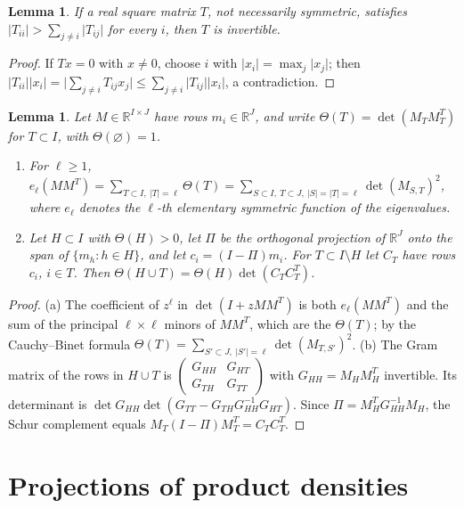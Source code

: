 \documentclass[11pt]{amsart}
\numberwithin{equation}{section}
\newtheorem{lemma}[theorem]{Lemma}
\theoremstyle{definition}
\theoremstyle{remark}
\newcommand{\R}{\mathbb R}
\newcommand{\1}{\mathbf 1}
\newcommand{\abs}[1]{\lvert #1\rvert}
\begin{document}
\begin{lemma}\label{lem:dd}
If a real square matrix $T$, not necessarily symmetric, satisfies $\abs{T_{ii}}>\sum_{j\ne i}\abs{T_{ij}}$ for every $i$, then $T$ is invertible.
\end{lemma}

\begin{proof}
If $Tx=0$ with $x\ne0$, choose $i$ with $\abs{x_i}=\max_j\abs{x_j}$; then $\abs{T_{ii}}\abs{x_i}=\abs{\sum_{j\ne i}T_{ij}x_j}\le\sum_{j\ne i}\abs{T_{ij}}\abs{x_i}$, a contradiction.
\end{proof}

\begin{lemma}\label{lem:gram}
Let $M\in\R^{I\times J}$ have rows $m_i\in\R^J$, and write $\Theta(T)=\det(M_TM_T^T)$ for $T\subset I$, with $\Theta(\varnothing)=1$.
\begin{enumerate}
\item[(a)] For $\ell\ge1$, $e_\ell(MM^T)=\sum_{T\subset I,\ \abs T=\ell}\Theta(T)=\sum_{S\subset I,\ T\subset J,\ \abs S=\abs T=\ell}\det(M_{S,T})^2$, where $e_\ell$ denotes the $\ell$-th elementary symmetric function of the eigenvalues.
\item[(b)] Let $H\subset I$ with $\Theta(H)>0$, let $\Pi$ be the orthogonal projection of $\R^J$ onto the span of $\{m_h:h\in H\}$, and let $c_i=(I-\Pi)m_i$. For $T\subset I\setminus H$ let $C_T$ have rows $c_i$, $i\in T$. Then $\Theta(H\cup T)=\Theta(H)\det(C_TC_T^T)$.
\end{enumerate}
\end{lemma}

\begin{proof}
(a) The coefficient of $z^\ell$ in $\det(I+zMM^T)$ is both $e_\ell(MM^T)$ and the sum of the principal $\ell\times\ell$ minors of $MM^T$, which are the $\Theta(T)$; by the Cauchy--Binet formula $\Theta(T)=\sum_{S'\subset J,\ \abs{S'}=\ell}\det(M_{T,S'})^2$. (b) The Gram matrix of the rows in $H\cup T$ is $\begin{pmatrix}G_{HH}&G_{HT}\\G_{TH}&G_{TT}\end{pmatrix}$ with $G_{HH}=M_HM_H^T$ invertible. Its determinant is $\det G_{HH}\det(G_{TT}-G_{TH}G_{HH}^{-1}G_{HT})$. Since $\Pi=M_H^TG_{HH}^{-1}M_H$, the Schur complement equals $M_T(I-\Pi)M_T^T=C_TC_T^T$.
\end{proof}

\section{Projections of product densities}\label{sec:proj}
\end{document}
